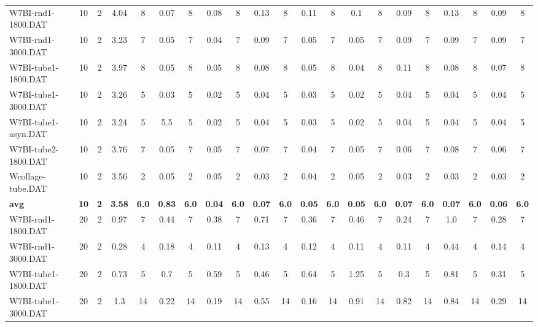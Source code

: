 \begin{sidewaystable}[!ht]
{\begin{tabular}{lcccccccccccccccccccc}
W7BI-rnd1-1800.DAT & 10 & 2 & 4.04 & 8 &  \textcolor{blue2}{0.07} & 8 & 0.08 & 8 & 0.13 & 8 & 0.11 & 8 & 0.1 & 8 & 0.09 & 8 & 0.13 & 8 & 0.09 & 8 \\
W7BI-rnd1-3000.DAT & 10 & 2 & 3.23 & 7 & 0.05 & 7 &  \textcolor{blue2}{0.04} & 7 & 0.09 & 7 & 0.05 & 7 & 0.05 & 7 & 0.09 & 7 & 0.09 & 7 & 0.09 & 7 \\
W7BI-tube1-1800.DAT & 10 & 2 & 3.97 & 8 & 0.05 & 8 & 0.05 & 8 & 0.08 & 8 & 0.05 & 8 &  \textcolor{blue2}{0.04} & 8 & 0.11 & 8 & 0.08 & 8 & 0.07 & 8 \\
W7BI-tube1-3000.DAT & 10 & 2 & 3.26 & 5 & 0.03 & 5 &  \textcolor{blue2}{0.02} & 5 & 0.04 & 5 & 0.03 & 5 &  \textcolor{blue2}{0.02} & 5 & 0.04 & 5 & 0.04 & 5 & 0.04 & 5 \\
W7BI-tube1-asyn.DAT & 10 & 2 & 3.24 & 5 & 5.5 & 5 &  \textcolor{blue2}{0.02} & 5 & 0.04 & 5 & 0.03 & 5 &  \textcolor{blue2}{0.02} & 5 & 0.04 & 5 & 0.04 & 5 & 0.04 & 5 \\
W7BI-tube2-1800.DAT & 10 & 2 & 3.76 & 7 & 0.05 & 7 & 0.05 & 7 & 0.07 & 7 &  \textcolor{blue2}{0.04} & 7 & 0.05 & 7 & 0.06 & 7 & 0.08 & 7 & 0.06 & 7 \\
Wcollage-tube.DAT & 10 & 2 & 3.56 & 2 & 0.05 & 2 & 0.05 & 2 &  \textcolor{blue2}{0.03} & 2 & 0.04 & 2 & 0.05 & 2 &  \textcolor{blue2}{0.03} & 2 &  \textcolor{blue2}{0.03} & 2 &  \textcolor{blue2}{0.03} & 2 \\
\cline{1-21} \textbf{avg} & \textbf{10} & \textbf{2} & \textbf{3.58} & \textbf{6.0} & \textbf{0.83} & \textbf{6.0} & \textbf{0.04} & \textbf{6.0} & \textbf{0.07} & \textbf{6.0} & \textbf{0.05} & \textbf{6.0} & \textbf{0.05} & \textbf{6.0} & \textbf{0.07} & \textbf{6.0} & \textbf{0.07} & \textbf{6.0} & \textbf{0.06} & \textbf{6.0} \\ \cline{1-21}
W7BI-rnd1-1800.DAT & 20 & 2 & 0.97 & 7 & 0.44 & 7 & 0.38 & 7 & 0.71 & 7 & 0.36 & 7 & 0.46 & 7 &  \textcolor{blue2}{0.24} & 7 & 1.0 & 7 & 0.28 & 7 \\
W7BI-rnd1-3000.DAT & 20 & 2 & 0.28 & 4 & 0.18 & 4 &  \textcolor{blue2}{0.11} & 4 & 0.13 & 4 & 0.12 & 4 &  \textcolor{blue2}{0.11} & 4 &  \textcolor{blue2}{0.11} & 4 & 0.44 & 4 & 0.14 & 4 \\
W7BI-tube1-1800.DAT & 20 & 2 & 0.73 & 5 & 0.7 & 5 & 0.59 & 5 & 0.46 & 5 & 0.64 & 5 & 1.25 & 5 &  \textcolor{blue2}{0.3} & 5 & 0.81 & 5 & 0.31 & 5 \\
W7BI-tube1-3000.DAT & 20 & 2 & 1.3 & 14 & 0.22 & 14 & 0.19 & 14 & 0.55 & 14 &  \textcolor{blue2}{0.16} & 14 & 0.91 & 14 & 0.82 & 14 & 0.84 & 14 & 0.29 & 14 \\

\end{tabular}}
\end{sidewaystable}
